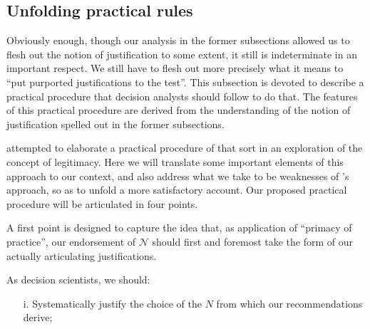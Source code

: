 \documentclass[preprint, french, english, 11pt, authoryear]{elsarticle}%
\newcommand{\adv}{\mathscr{N}}
\begin{document}
\subsection{Unfolding practical rules}
Obviously enough, though our analysis in the former subsections allowed us to flesh out the notion of justification to some extent, it still is indeterminate in an important respect. We still have to flesh out more precisely what it means to ``put purported justifications to the test''. This subsection is devoted to describe a practical procedure that decision analysts should follow to do that. The features of this practical procedure are derived from the understanding of the notion of justification spelled out in the former subsections.

\citet{meinard_what_2017} attempted to elaborate a practical procedure of that sort in an exploration of the concept of legitimacy. Here we will translate some important elements of this approach to our context, and also address what we take to be weaknesses of \cite{meinard_what_2017}'s approach, so as to unfold a more satisfactory account. Our proposed practical procedure will be articulated in four points.

A first point is designed to capture the idea that, as application of “primacy of practice”, our endorsement of $\adv$ should first and foremost take the form of our actually articulating justifications.

As decision scientists, we should:
\begin{itemize}
\item[i.]	Systematically justify the choice of the $N$ from which our recommendations derive;
\end{itemize}
\end{document}
